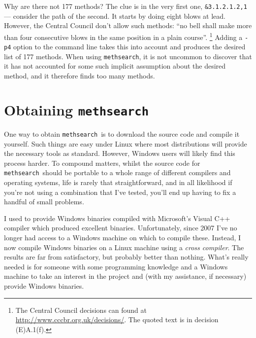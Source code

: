 \documentclass[a4paper,11pt,oneside]{book}
\makeatletter
\def\textitidx#1{\textit{#1}\index{#1}}
\newcommand{\oi}[1]{\index{#1@{\hspace*{-\optwidth}\texttt{-}\texttt{#1}}}}
\def\methsearch{\texttt{meth\-search}}
\makeatother
\begin{document}
Why are there not 177 methods?  The clue is in the very first one,
\verb+&3.1.2.1.2,1+ --- consider the path of the second.  It starts 
by doing eight blows at lead.  However, the Central Council don't allow
such methods: ``no bell shall make more than 
four consecutive blows in the same position in a plain course''.%
\footnote{The Central Council decisions can found at 
\url{http://www.cccbr.org.uk/decisions/}.
The quoted text is in decision (E)A.1(f).}
Adding a \verb+-p4+ option\oi{p} to the command line takes this into account
and produces the desired list of 177 methods.  
When using \methsearch, it is not uncommon to discover that it has not
accounted for some such implicit assumption about the desired method, 
and it therefore finds too many methods.


\section{Obtaining \methsearch}\label{obtain}

One way to obtain \methsearch\ is to download the source code and
compile it yourself.  Such things are easy under Linux where most 
distributions will provide the necessary tools as standard.  However,
Windows users will likely find this process harder.  To compound matters,
whilst the source code for \methsearch\ should be portable to a whole 
range of different compilers and operating systems, life is rarely that 
straightforward, and in all likelihood if you're not using a combination
that I've tested, you'll end up having to fix a handful of small problems.

I used to provide Windows binaries compiled with Microsoft's 
Visual C++ compiler which produced excellent
binaries.  Unfortunately, since 2007 I've no longer had access to a Windows
machine on which to compile these.  Instead, I now compile Windows binaries
on a Linux machine using a \textitidx{cross compiler}.  The results are far
from satisfactory, but probably better than nothing.  What's    
really needed is for someone with some programming knowledge and a Windows      
machine to take an interest in the project and (with my assistance, 
if necessary) provide Windows binaries.
\end{document}
